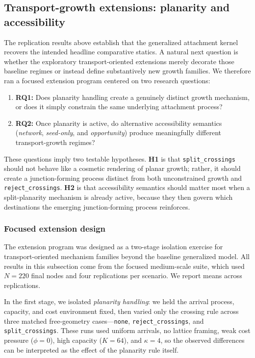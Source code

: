 \subsection{Transport-growth extensions: planarity and accessibility}
\label{sec:extensions}

The replication results above establish that the generalized attachment kernel
recovers the intended headline comparative statics. A natural next question is
whether the exploratory transport-oriented extensions merely decorate those
baseline regimes or instead define substantively new growth families. We
therefore ran a focused extension program centered on two research questions:
\begin{enumerate}[leftmargin=1.5em]
    \item \textbf{RQ1:} Does planarity handling create a genuinely distinct
    growth mechanism, or does it simply constrain the same underlying
    attachment process?
    \item \textbf{RQ2:} Once planarity is active, do alternative accessibility
    semantics (\emph{network}, \emph{seed-only}, and \emph{opportunity})
    produce meaningfully different transport-growth regimes?
\end{enumerate}

These questions imply two testable hypotheses. \textbf{H1} is that
\texttt{split\_crossings} should not behave like a cosmetic rendering of planar
growth; rather, it should create a junction-forming process distinct from both
unconstrained growth and \texttt{reject\_crossings}. \textbf{H2} is that
accessibility semantics should matter most when a split-planarity mechanism is
already active, because they then govern which destinations the emerging
junction-forming process reinforces.

\subsubsection{Focused extension design}

The extension program was designed as a two-stage isolation exercise for
transport-oriented mechanism families beyond the baseline generalized model.
All results in this subsection come from the focused medium-scale suite, which
used $N=220$ final nodes and four replications per scenario. We report means
across replications.

In the first stage, we isolated \emph{planarity handling}: we held the arrival
process, capacity, and cost environment fixed, then varied only the crossing
rule across three matched free-geometry cases---\texttt{none},
\texttt{reject\_crossings}, and \texttt{split\_crossings}. These runs used
uniform arrivals, no lattice framing, weak cost pressure ($\phi=0$), high
capacity ($K=64$), and $\kappa=4$, so the observed differences can be
interpreted as the effect of the planarity rule itself.

